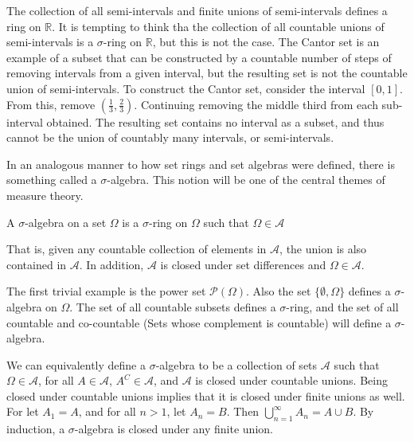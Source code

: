 \documentclass[crop=false,class=book,oneside]{standalone}
\begin{document}
        \begin{example}
            The collection of all semi-intervals and finite
            unions of semi-intervals defines a ring on
            $\mathbb{R}$. It is tempting to think tha the
            collection of all countable unions of semi-intervals
            is a $\sigma$-ring on $\mathbb{R}$, but this is not
            the case. The Cantor set is an example of a subset
            that can be constructed by a countable number of
            steps of removing intervals from a given interval,
            but the resulting set is not the countable union of
            semi-intervals. To construct the Cantor set, consider
            the interval $[0,1]$. From this, remove
            $(\frac{1}{3},\frac{2}{3})$. Continuing removing the
            middle third from each sub-interval obtained. The
            resulting set contains no interval as a subset, and
            thus cannot be the union of countably many intervals,
            or semi-intervals.
        \end{example}
        In an analogous manner to how set rings and set algebras
        were defined, there is something called a $\sigma$-algebra.
        This notion will be one of the central themes of measure
        theory.
        \begin{definition}
            A $\sigma$-algebra on a set $\Omega$ is a
            $\sigma$-ring on $\Omega$ such that
            $\Omega\in\mathcal{A}$
        \end{definition}
        That is, given any countable collection of elements in
        $\mathcal{A}$, the union is also contained in
        $\mathcal{A}$. In addition, $\mathcal{A}$ is closed under
        set differences and $\Omega\in\mathcal{A}$.
        \begin{example}
            The first trivial example is the power set
            $\mathcal{P}(\Omega)$. Also the set
            $\{\emptyset,\Omega\}$ defines a $\sigma$-algebra on
            $\Omega$. The set of all countable subsets defines
            a $\sigma$-ring, and the set of all countable and
            co-countable (Sets whose complement is countable)
            will define a $\sigma$-algebra.
        \end{example}
        We can equivalently define a $\sigma$-algebra to be a
        collection of sets $\mathcal{A}$ such that
        $\Omega\in\mathcal{A}$, for all $A\in\mathcal{A}$,
        $A^{C}\in\mathcal{A}$, and $\mathcal{A}$ is closed under
        countable unions. Being closed under countable unions
        implies that it is closed under finite unions as well.
        For let $A_{1}=A$, and for all $n>1$, let $A_{n}=B$.
        Then $\bigcup_{n=1}^{\infty}A_{n}=A\cup{B}$. By induction,
        a $\sigma$-algebra is closed under any finite union.
\end{document}
